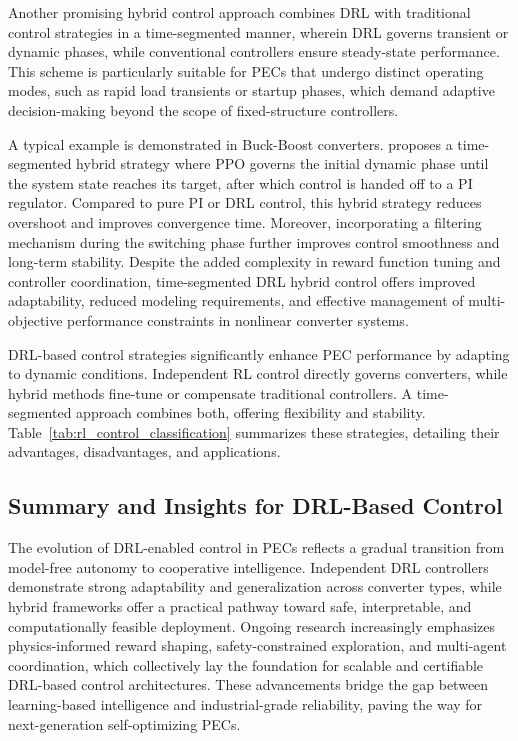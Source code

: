 Another promising hybrid control approach combines DRL with traditional control strategies in a time-segmented manner, wherein DRL governs transient or dynamic phases, while conventional controllers ensure steady-state performance. This scheme is particularly suitable for PECs that undergo distinct operating modes, such as rapid load transients or startup phases, which demand adaptive decision-making beyond the scope of fixed-structure controllers.

A typical example is demonstrated in Buck-Boost converters. \cite{prag2021data} proposes a time-segmented hybrid strategy where PPO governs the initial dynamic phase until the system state reaches its target, after which control is handed off to a PI regulator. Compared to pure PI or DRL control, this hybrid strategy reduces overshoot and improves convergence time. Moreover, incorporating a filtering mechanism during the switching phase further improves control smoothness and long-term stability. Despite the added complexity in reward function tuning and controller coordination, time-segmented DRL hybrid control offers improved adaptability, reduced modeling requirements, and effective management of multi-objective performance constraints in nonlinear converter systems.

DRL-based control strategies significantly enhance PEC performance by adapting to dynamic conditions. Independent RL control directly governs converters, while hybrid methods fine-tune or compensate traditional controllers. A time-segmented approach combines both, offering flexibility and stability. Table~\ref{tab:rl_control_classification} summarizes these strategies, detailing their advantages, disadvantages, and applications.

\subsection{Summary and Insights for DRL-Based Control}

The evolution of DRL-enabled control in PECs reflects a gradual transition from model-free autonomy to cooperative intelligence. 
Independent DRL controllers demonstrate strong adaptability and generalization across converter types, 
while hybrid frameworks offer a practical pathway toward safe, interpretable, and computationally feasible deployment. 
Ongoing research increasingly emphasizes physics-informed reward shaping, safety-constrained exploration, 
and multi-agent coordination, which collectively lay the foundation for scalable and certifiable DRL-based control architectures. 
These advancements bridge the gap between learning-based intelligence and industrial-grade reliability, 
paving the way for next-generation self-optimizing PECs.

